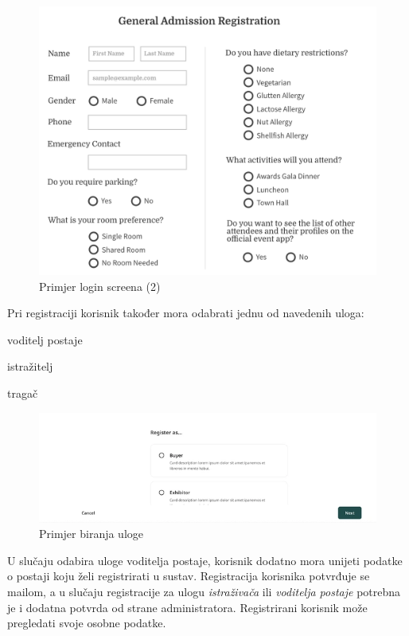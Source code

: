 		\begin{figure}[H]
			\includegraphics[scale=0.35]{slike/login_screen2.PNG} %
			\centering
			\caption{Primjer login screena (2)}
			\label{fig:promjene}
		\end{figure}
		
		Pri registraciji korisnik također mora odabrati jednu od navedenih uloga:
		\begin{packed_item}
			\item voditelj postaje
			\item istražitelj
			\item tragač
		\end{packed_item}
		
		\begin{figure}[H]
			\includegraphics{slike/biranje_uloge.PNG} %
			\centering
			\caption{Primjer biranja uloge}
			\label{fig:promjene}
		\end{figure}
		
		U slučaju odabira uloge voditelja postaje, korisnik dodatno mora unijeti podatke o postaji koju želi registrirati u sustav.
		Registracija korisnika potvrđuje se mailom, a u slučaju registracije za ulogu \textit{istraživača} ili \textit{voditelja postaje} potrebna je i dodatna potvrda od strane administratora.
		Registrirani korisnik može pregledati svoje osobne podatke.
		
